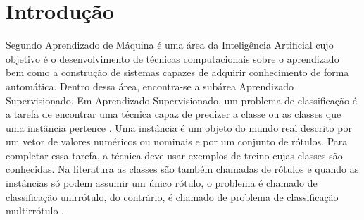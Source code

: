 \newcommand{\NbasesV}{\textit{N}}
\newcommand{\Nbases}{8}
\newcommand{\Nml}{6}
\newcommand{\NmlT}{5}
\newcommand{\NmlA}{2}
\newcommand{\Ncb}{4}
\newcommand{\MML}{método multirrótulo}
\newcommand{\MMLs}{métodos multirrótulo}



\newcommand{\jqo}{C4.5}
\newcommand{\EBA}{\textit{Example Based Accuracy}}
\newcommand{\SA}{\textit{Subset Accuracy}}
\newcommand{\HL}{\textit{Hamming Loss}}

\newcommand{\BR}{\textit{Binary Relevance}}
\newcommand{\tabmode}{h}
\newcommand{\legendaTab}[2]{Desempenho dos métodos multirrótulos com \textit{#2} medidos pelas métricas \SA,\HL~e~\EBA}

\chapter{Introdução}
Segundo \cite{rezende2003sistemas} Aprendizado de Máquina é uma área da Inteligência Artificial
cujo objetivo é o desenvolvimento de técnicas computacionais
sobre o aprendizado bem como a construção de sistemas capazes de adquirir
conhecimento de forma automática. Dentro dessa área, encontra-se a subárea Aprendizado Supervisionado.
Em Aprendizado Supervisionado, um problema de classificação é a tarefa de encontrar
uma técnica capaz de predizer a classe ou as classes que uma instância
pertence \cite{rezende2003sistemas}.
Uma instância é um objeto do mundo real descrito
por um vetor de valores numéricos ou nominais e por um conjunto de rótulos.
Para completar essa tarefa, a técnica deve usar exemplos de treino cujas classes
são conhecidas. 
Na literatura \cite{rezende2003sistemas} as classes são também chamadas de rótulos
e quando as instâncias só podem assumir um único rótulo, o problema é chamado de classificação unirrótulo,
do contrário, é chamado de problema de classificação multirrótulo \cite{borges2012}.

